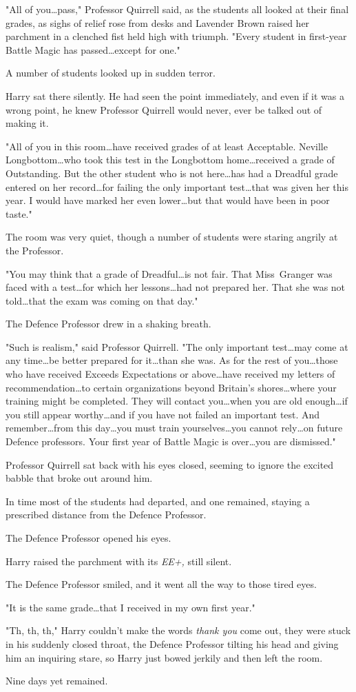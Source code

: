 "All of you…pass," Professor Quirrell said, as the students all looked
at their final grades, as sighs of relief rose from desks and Lavender Brown
raised her parchment in a clenched fist held high with triumph. "Every student
in first-year Battle Magic has passed…except for one."

A number of students looked up in sudden terror.

Harry sat there silently. He had seen the point immediately, and even if it was
a wrong point, he knew Professor Quirrell would never, ever be talked out of
making it.

"All of you in this room…have received grades of at least Acceptable.
Neville Longbottom…who took this test in the Longbottom home…received
a grade of Outstanding. But the other student who is not here…has
had a Dreadful grade entered on her record…for failing the only
important test…that was given her this year. I would have marked her
even lower…but that would have been in poor taste."

The room was very quiet, though a number of students were staring angrily at
the Professor.

"You may think that a grade of Dreadful…is not fair. That Miss~Granger
was faced with a test…for which her lessons…had not prepared
her. That she was not told…that the exam was coming on that day."

The Defence Professor drew in a shaking breath.

"Such is realism," said Professor Quirrell. "The only important test…may
come at any time…be better prepared for it…than she was. As
for the rest of you…those who have received Exceeds Expectations or
above…have received my letters of recommendation…to certain
organizations beyond Britain’s shores…where your training might be
completed. They will contact you…when you are old enough…if you
still appear worthy…and if you have not failed an important test. And
remember…from this day…you must train yourselves…you
cannot rely…on future Defence professors. Your first year of Battle
Magic is over…you are dismissed."

Professor Quirrell sat back with his eyes closed, seeming to ignore the excited
babble that broke out around him.

In time most of the students had departed, and one remained, staying a
prescribed distance from the Defence Professor.

The Defence Professor opened his eyes.

Harry raised the parchment with its \emph{EE+,} still silent.

The Defence Professor smiled, and it went all the way to those tired eyes.

"It is the same grade…that I received in my own first year."

"Th, th, th," Harry couldn’t make the words \emph{thank you} come out, they
were stuck in his suddenly closed throat, the Defence Professor tilting his
head and giving him an inquiring stare, so Harry just bowed jerkily and then
left the room.

Nine days yet remained.
